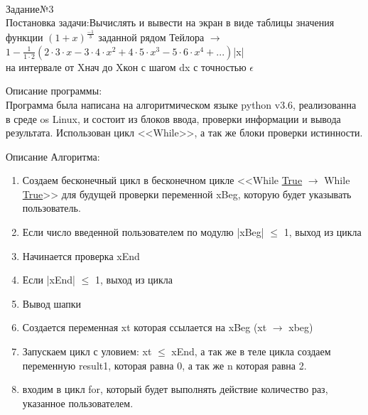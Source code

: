 \documentclass[a4paper]{article}
\begin{document}
    \begin{lab3.3}
        \begin{center}\underline{\hspace{6cm}}\\
            Задание№3\\
            Постановка задачи:\hspace{5mm}Вычислять и вывести на экран в виде таблицы значения функции $(1+x)^\frac{-1}{3}$ заданной рядом Тейлора $\to$\\
            \hspace{2cm}$1-\frac{1}{1\cdot2}(2\cdot3\cdot x-3\cdot4\cdot x^2+4\cdot5\cdot x^3-5\cdot6\cdot x^4+...)$\hspace{2cm}|x|\\
            на интервале от X\footnotesize{нач} до X\footnotesize{кон} с шагом dx с точностью $\epsilon$
        \end{center}
        \begin{description}
        Описание программы:\\
            Программа была написана на алгоритмическом языке python v3.6, реализованна в среде os Linux, и состоит из блоков ввода, проверки информации и вывода результата. Использован цикл <<While>>, а так же блоки проверки истинности.
        \end{description}
        Описание Алгоритма:
        \begin{algoritm}
        \small\begin{enumerate}
            \item Создаем бесконечный цикл в бесконечном цикле <<While \underline{True} $\to$ While \underline{True}>> для будущей проверки переменной xBeg, которую будет указывать пользователь.
            \item Если число введенной пользователем по модулю |xBeg| $\leq$ 1, выход из цикла
            \item Начинается проверка xEnd
            \item Если |xEnd| $\leq$ 1, выход из цикла
            \item Вывод шапки
            \item Создается переменная xt которая ссылается на xBeg (xt $\to$ xbeg)
            \item Запускаем цикл с уловием: xt $\leq$ xEnd, а так же в теле цикла создаем переменную result1, которая равна 0, а так же n которая равна 2.
            \item входим в цикл for, который будет выполнять действие количество раз, указанное пользователем.

\end{enumerate}
\end{algoritm}
\end{lab3.3}
\end{document}
